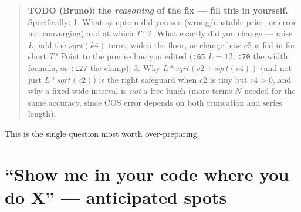 \documentclass[
  11pt,
]{article}
\begin{document}
\begin{quote}
\textbf{TODO (Bruno): the \emph{reasoning} of the fix --- fill this in
yourself.} Specifically: 1. What symptom did you see (wrong/unstable
price, or error not converging) and at which \(T\)? 2. What exactly did
you change --- raise \(L\), add the \(sqrt(k4)\) term, widen the floor,
or change how \(c2\) is fed in for short \(T\)? Point to the precise
line you edited (\texttt{:65} \(L=12\), \texttt{:70} the width formula,
or \texttt{:127} the clamp). 3. Why \(L*sqrt(c2 + sqrt(c4))\) (and not
just \(L*sqrt(c2)\)) is the right safeguard when \(c2\) is tiny but
\(c4 > 0\), and why a fixed wide interval is \emph{not} a free lunch
(more terms \(N\) needed for the same accuracy, since COS error depends
on both truncation and series length).
\end{quote}

This is the single question most worth over-preparing.

\hypertarget{show-me-in-your-code-where-you-do-x-anticipated-spots}{%
\section{``Show me in your code where you do X'' --- anticipated
spots}\label{show-me-in-your-code-where-you-do-x-anticipated-spots}}
\end{document}
